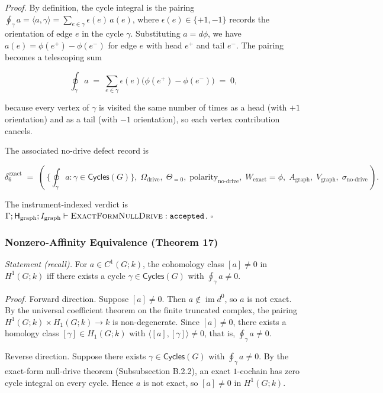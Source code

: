 \documentclass[11pt]{article}
\theoremstyle{definition}
\begin{document}
\emph{Proof.} By definition, the cycle integral is the pairing \(\oint_{\gamma}a=\langle a,\gamma\rangle=\sum_{e\in\gamma}\epsilon(e)\,a(e)\), where \(\epsilon(e)\in\{+1,-1\}\) records the orientation of edge \(e\) in the cycle \(\gamma\). Substituting \(a=d\phi\), we have \(a(e)=\phi(e^{+})-\phi(e^{-})\) for edge \(e\) with head \(e^{+}\) and tail \(e^{-}\). The pairing becomes a telescoping sum

\[
\oint_{\gamma}a\;=\;\sum_{e\in\gamma}\epsilon(e)\bigl(\phi(e^{+})-\phi(e^{-})\bigr)\;=\;0,
\]

because every vertex of \(\gamma\) is visited the same number of times as a head (with \(+1\) orientation) and as a tail (with \(-1\) orientation), so each vertex contribution cancels.

The associated no-drive defect record is

\[
\delta_{6}^{\mathrm{exact}}\;=\;(\,\{\oint_{\gamma}a:\gamma\in\mathsf{Cycles}(G)\},\;\Omega_{\mathrm{drive}},\;\Theta_{=0},\;\mathrm{polarity}_{\mathrm{no\text{-}drive}},\;W_{\mathrm{exact}}=\phi,\;A_{\mathrm{graph}},\;V_{\mathrm{graph}},\;\sigma_{\mathrm{no\text{-}drive}}\,).
\]

The instrument-indexed verdict is \(\Gamma;\mathsf H_{\mathrm{graph}};I_{\mathrm{graph}}\vdash\textsc{ExactFormNullDrive}:\texttt{accepted}\). \(\square\)

\subsubsection{Nonzero-Affinity Equivalence (Theorem 17)}

\emph{Statement (recall).} For \(a\in C^{1}(G;k)\), the cohomology class \([a]\neq 0\) in \(H^{1}(G;k)\) iff there exists a cycle \(\gamma\in\mathsf{Cycles}(G)\) with \(\oint_{\gamma}a\neq 0\).

\emph{Proof.} Forward direction. Suppose \([a]\neq 0\). Then \(a\notin\operatorname{im} d^{0}\), so \(a\) is not exact. By the universal coefficient theorem on the finite truncated complex, the pairing \(H^{1}(G;k)\times H_{1}(G;k)\to k\) is non-degenerate. Since \([a]\neq 0\), there exists a homology class \([\gamma]\in H_{1}(G;k)\) with \(\langle[a],[\gamma]\rangle\neq 0\), that is, \(\oint_{\gamma}a\neq 0\).

Reverse direction. Suppose there exists \(\gamma\in\mathsf{Cycles}(G)\) with \(\oint_{\gamma}a\neq 0\). By the exact-form null-drive theorem (Subsubsection B.2.2), an exact \(1\)-cochain has zero cycle integral on every cycle. Hence \(a\) is not exact, so \([a]\neq 0\) in \(H^{1}(G;k)\).
\end{document}
